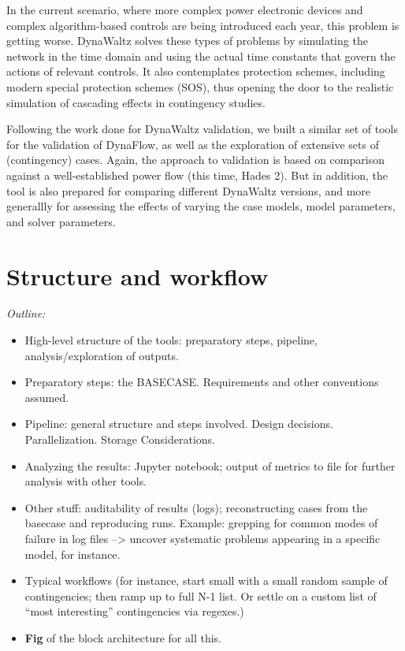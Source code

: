 \documentclass[conference]{IEEEtran}
\begin{document}
In the current scenario, where more complex power electronic devices and complex
algorithm-based controls are being introduced each year, this problem is getting
worse. DynaWaltz solves these types of problems by simulating the network in the
time domain and using the actual time constants that govern the actions of
relevant controls. It also contemplates protection schemes, including modern
special protection schemes (SOS), thus opening the door to the realistic
simulation of cascading effects in contingency studies.

Following the work done for DynaWaltz validation, we built a similar set of
tools for the validation of DynaFlow, as well as the exploration of extensive
sets of (contingency) cases.  Again, the approach to validation is based on
comparison against a well-established power flow (this time, Hades 2). But in
addition, the tool is also prepared for comparing different DynaWaltz versions,
and more generallly for assessing the effects of varying the case models, model
parameters, and solver parameters.







\section{Structure and workflow}

\begin{center}
  \itshape
  Outline:
  \begin{itemize}
    \item High-level structure of the tools: preparatory steps, pipeline,
          analysis/exploration of outputs.
    \item Preparatory steps: the BASECASE. Requirements and other conventions
          assumed.
    \item Pipeline: general structure and steps involved. Design
          decisions. Parallelization. Storage Considerations.
    \item Analyzing the results: Jupyter notebook; output of metrics to
          file for further analysis with other tools.
    \item Other stuff: auditability of results (logs); reconstructing
          cases from the basecase and reproducing runs. Example: grepping for
          common modes of failure in log files --> uncover systematic problems
          appearing in a specific model, for instance.
    \item Typical workflows (for instance, start small with a small random
          sample of contingencies; then ramp up to full N-1 list. Or settle on
          a custom list of ``most interesting'' contingencies via regexes.)
    \item \textbf{Fig} of the block architecture for all this.
  \end{itemize}
\end{center}
\end{document}
